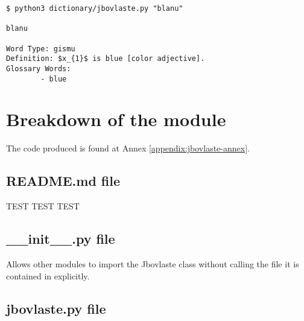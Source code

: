 \begin{lstlisting}[caption=Jbovlaste module being used as a command-line interface tool]
$ python3 dictionary/jbovlaste.py "blanu"

blanu

Word Type: gismu
Definition: $x_{1}$ is blue [color adjective].
Glossary Words:
        - blue
\end{lstlisting}

\section{Breakdown of the module}

The code produced is found at Annex \ref{appendix:jbovlaste-annex}.

\subsection*{README.md file}

TEST TEST TEST

\subsection*{\_\_init\_\_.py file}

Allows other modules to import the Jbovlaste class without calling the file it is contained in explicitly.

\subsection*{jbovlaste.py file}

